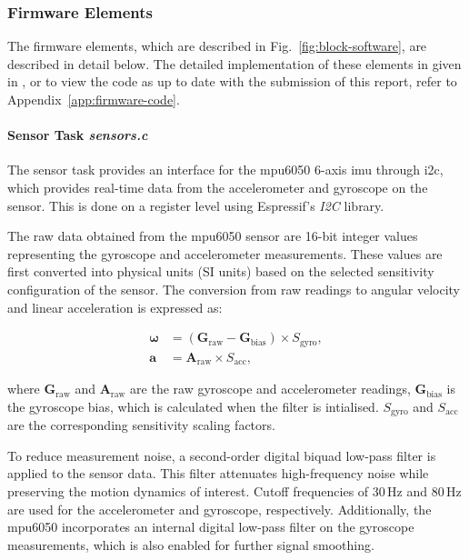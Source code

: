 \subsubsection{Firmware Elements}

The firmware elements, which are described in Fig.~\ref{fig:block-software}, are described in detail below. The detailed implementation of these elements in given in \cite{flightcontroller_git}, or to view the code as up to date with the submission of this report, refer to Appendix~\ref{app:firmware-code}.

\paragraph{\textbf{Sensor Task} \textit{sensors.c}} \leavevmode

The sensor task provides an interface for the \gls{mpu6050} 6-axis \gls{imu} through \gls{i2c}, which provides real-time data from the accelerometer and gyroscope on the sensor. This is done on a register level using Espressif's \textit{I2C} library.

The raw data obtained from the \gls{mpu6050} sensor are 16-bit integer values representing the gyroscope and accelerometer measurements. These values are first converted into physical units (SI units) based on the selected sensitivity configuration of the sensor. The conversion from raw readings to angular velocity and linear acceleration is expressed as:

\begin{align}
\boldsymbol{\omega} &= (\mathbf{G}_{\text{raw}} - \mathbf{G}_{\text{bias}}) \times S_{\text{gyro}}, \\[6pt]
\mathbf{a} &= \mathbf{A}_{\text{raw}} \times S_{\text{acc}},
\end{align}

where \( \mathbf{G}_{\text{raw}} \) and \( \mathbf{A}_{\text{raw}} \) are the raw gyroscope and accelerometer readings, 
\( \mathbf{G}_{\text{bias}} \) is the gyroscope bias, which is calculated when the filter is intialised. \( S_{\text{gyro}} \) and \( S_{\text{acc}} \) are the corresponding sensitivity scaling factors.

To reduce measurement noise, a second-order digital biquad low-pass filter is applied to the sensor data. This filter attenuates high-frequency noise while preserving the motion dynamics of interest. Cutoff frequencies of 30\,Hz and 80\,Hz are used for the accelerometer and gyroscope, respectively. Additionally, the \gls{mpu6050} incorporates an internal digital low-pass filter on the gyroscope measurements, which is also enabled for further signal smoothing.

